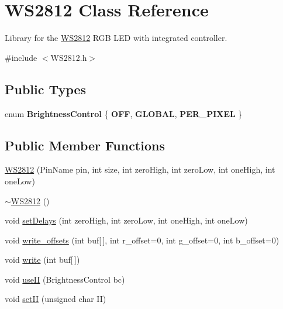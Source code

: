 \hypertarget{class_w_s2812}{}\section{W\+S2812 Class Reference}
\label{class_w_s2812}


Library for the \hyperlink{class_w_s2812}{W\+S2812} R\+GB L\+ED with integrated controller.  




{\ttfamily \#include $<$W\+S2812.\+h$>$}

\subsection*{Public Types}
\begin{DoxyCompactItemize}
\item 
\mbox{\label{class_w_s2812_a14186f70863bf4f3a35b2cc21b15642d}} 
enum {\bfseries Brightness\+Control} \{ {\bfseries O\+FF}, 
{\bfseries G\+L\+O\+B\+AL}, 
{\bfseries P\+E\+R\+\_\+\+P\+I\+X\+EL}
 \}
\end{DoxyCompactItemize}
\subsection*{Public Member Functions}
\begin{DoxyCompactItemize}
\item 
\hyperlink{class_w_s2812_a397fb1e75594024884cb4365d3c725cd}{W\+S2812} (Pin\+Name pin, int size, int zero\+High, int zero\+Low, int one\+High, int one\+Low)
\item 
\hyperlink{class_w_s2812_a58973dedd9cbc5c3fd3397f07f9a720f}{$\sim$\+W\+S2812} ()
\item 
void \hyperlink{class_w_s2812_a7e1370e6fbb56daa68f1146e7b58d9ec}{set\+Delays} (int zero\+High, int zero\+Low, int one\+High, int one\+Low)
\item 
void \hyperlink{class_w_s2812_a578fd0b278445bd6f84e260a69b18a68}{write\+\_\+offsets} (int buf\mbox{[}$\,$\mbox{]}, int r\+\_\+offset=0, int g\+\_\+offset=0, int b\+\_\+offset=0)
\item 
void \hyperlink{class_w_s2812_ab85d6a78bc51929dac48db05f6bc68d4}{write} (int buf\mbox{[}$\,$\mbox{]})
\item 
void \hyperlink{class_w_s2812_acb221ea7ba9cfb40a43b7778f0dffa5d}{use\+II} (Brightness\+Control bc)
\item 
void \hyperlink{class_w_s2812_a8b6491617f9beb271d6d5c56ba384fb6}{set\+II} (unsigned char II)
\end{DoxyCompactItemize}


